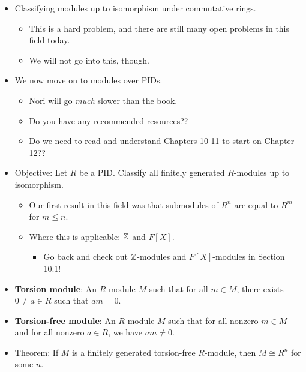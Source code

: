 \documentclass[../notes.tex]{subfiles}
\begin{document}
\begin{itemize}
\begin{proof}
        Let $I\subset R$ be a maximal ideal. (We know that one exists by the above corollary.) If $f:R^m\to R^n$ is an isomorphism of $R$-modules, then $f$ restricts to $I(R^m)\to I(R^n)$. This gives rise to the isomorphism $\bar{f}:R^m/I(R^m)\to R^n/I(R^n)$ of $R$-modules, in fact of $R/I$ modules. It follows that $R/I$ is a field, so $m=n$.
    \end{proof}
    \item Classifying modules up to isomorphism under commutative rings.
    \begin{itemize}
        \item This is a hard problem, and there are still many open problems in this field today.
        \item We will not go into this, though.
    \end{itemize}
    \item We now move on to modules over PIDs.
    \begin{itemize}
        \item Nori will go \emph{much} slower than the book.
        \item Do you have any recommended resources??
        \item Do we need to read and understand Chapters 10-11 to start on Chapter 12??
    \end{itemize}
    \item Objective: Let $R$ be a PID. Classify all finitely generated $R$-modules up to isomorphism.
    \begin{itemize}
        \item Our first result in this field was that submodules of $R^n$ are equal to $R^m$ for $m\leq n$.
        \item Where this is applicable: $\mathbb{Z}$ and $F[X]$.
        \begin{itemize}
            \item Go back and check out $\mathbb{Z}$-modules and $F[X]$-modules in Section 10.1!
        \end{itemize}
    \end{itemize}
    \item \textbf{Torsion module}: An $R$-module $M$ such that for all $m\in M$, there exists $0\neq a\in R$ such that $am=0$.
    \item \textbf{Torsion-free module}: An $R$-module $M$ such that for all nonzero $m\in M$ and for all nonzero $a\in R$, we have $am\neq 0$.
    \item Theorem: If $M$ is a finitely generated torsion-free $R$-module, then $M\cong R^n$ for some $n$.

\end{itemize}
\end{document}

